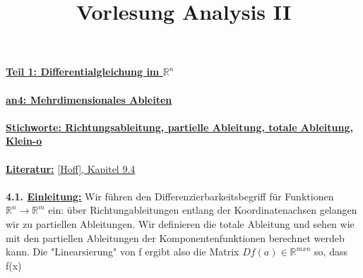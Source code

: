 \documentclass[]{scrartcl}
\title{Vorlesung Analysis II}
\begin{document}
	\textbf{\underline{Teil 1: Differentialgleichung im $\mathbb{R}^n$}}\\
	\\
	\textbf{\underline{an4: Mehrdimensionales Ableiten}}\\
	\\
	\textbf{\underline{\underline{Stichworte:} Richtungsableitung, partielle Ableitung, totale Ableitung, Klein-o}}\\
	\\
	\textbf{\underline{Literatur:}} \ul{[Hoff], Kapitel 9.4}\\
	\\
	\textbf{4.1. \underline{Einleitung:}} Wir führen den Differenzierbarkeitsbegriff  für Funktionen $\mathbb{R}^n\rightarrow\mathbb{R}^m$ ein: über Richtungableitungen entlang der Koordinatenachsen gelangen wir zu partiellen Ableitungen. Wir definieren die totale Ableitung und sehen wie mit den partiellen Ableitungen der Komponentenfunktionen berechnet werdeb kann. Die "Linearsierung" von f ergibt also die Matrix $Df(a)\in\mathbb{R}^{m x n}$ so, dass f(x)
	
	
	
	
	
	
\end{document}
